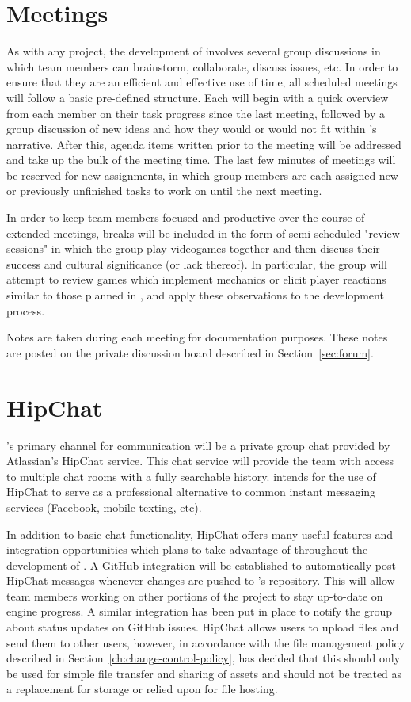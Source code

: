 \documentclass{GlobalDocument}
\begin{document}
\section{Meetings}
\label{sec:meetings}
As with any project, the development of \ourgame{} involves several group discussions in which team members can brainstorm, collaborate, discuss issues, etc. In order to ensure that they are an efficient and effective use of time, all scheduled meetings will follow a basic pre-defined structure. Each will begin with a quick overview from each member on their task progress since the last meeting, followed by a group discussion of new ideas and how they would or would not fit within \ourgame{}'s narrative. After this, agenda items written prior to the meeting will be addressed and take up the bulk of the meeting time. The last few minutes of meetings will be reserved for new assignments, in which group members are each assigned new or previously unfinished tasks to work on until the next meeting.

In order to keep team members focused and productive over the course of extended meetings, breaks will be included in the form of semi-scheduled "review sessions" in which the group play videogames together and then discuss their success and cultural significance (or lack thereof). In particular, the group will attempt to review games which implement mechanics or elicit player reactions similar to those planned in \ourgame, and apply these observations to the development process.

Notes are taken during each meeting for documentation purposes. These notes are posted on the private discussion board described in Section~\ref{sec:forum}. 

\section{HipChat}
\ourteam{}'s primary channel for communication will be a private group chat provided by Atlassian's HipChat service. This chat service will provide the team with access to multiple chat rooms with a fully searchable history. \ourteam{} intends for the use of HipChat to serve as a professional alternative to common instant messaging services (Facebook, mobile texting, etc). 

In addition to basic chat functionality, HipChat offers many useful features and integration opportunities which \ourteam{} plans to take advantage of throughout the development of \ourgame{}. A GitHub integration will be established to automatically post HipChat messages whenever changes are pushed to \ourengine{}'s repository. This will allow team members working on other portions of the project to stay up-to-date on engine progress. A similar integration has been put in place to notify the group about status updates on GitHub issues. HipChat allows users to upload files and send them to other users, however, in accordance with the file management policy described in Section~\ref{ch:change-control-policy}, \ourteam{} has decided that this should only be used for simple file transfer and sharing of assets and should not be treated as a replacement for storage or relied upon for file hosting.
\end{document}
